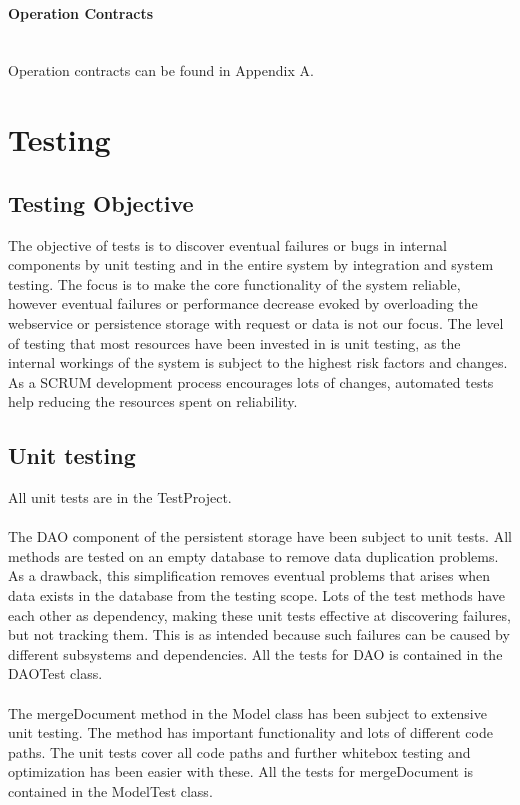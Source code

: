 \documentclass[a4paper,11pt,report]{report}
\begin{document}
\paragraph{Operation Contracts}  \mbox{} \\
Operation contracts can be found in Appendix A.

\section{Testing}
\subsection{Testing Objective}
The objective of tests is to discover eventual failures or bugs in internal components by unit testing and in the entire system by integration and system testing. The focus is to make the core functionality of the system reliable, however eventual failures or performance decrease evoked by overloading the webservice or persistence storage with request or data is not our focus. The level of testing that most resources have been invested in is unit testing, as the internal workings of the system is subject to the highest risk factors and changes. As a SCRUM development process encourages lots of changes, automated tests help reducing the resources spent on reliability. 
\subsection{Unit testing}
All unit tests are in the TestProject. \\ \\
The DAO component of the persistent storage have been subject to unit tests. All methods are tested on an empty database to remove data duplication problems. As a drawback, this simplification removes eventual problems that arises when data exists in the database from the testing scope. Lots of the test methods have each other as dependency, making these unit tests effective at discovering failures, but not tracking them. This is as intended because such failures can be caused by different subsystems and dependencies. All the tests for DAO is contained in the DAOTest class. \\ \\
The mergeDocument method in the Model class has been subject to extensive unit testing. The method has important functionality and lots of different code paths. The unit tests cover all code paths and further whitebox testing and optimization has been easier with these. All the tests for mergeDocument is contained in the ModelTest class.
\end{document}
